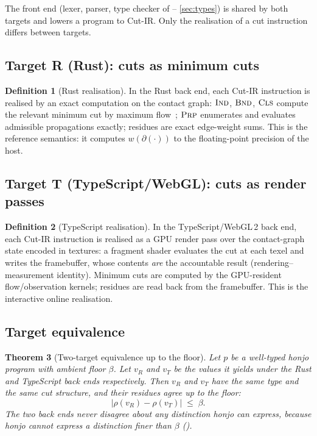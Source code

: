 \documentclass[11pt,a4paper]{article}
\theoremstyle{thmstyle}
\newtheorem{theorem}{Theorem}[section]
\theoremstyle{definition}
\newtheorem{definition}[theorem]{Definition}
\theoremstyle{remark}
\newcommand{\flo}{\beta}
\newcommand{\res}{\rho}
\newcommand{\cut}{\partial}
\newcommand{\abs}[1]{\lvert#1\rvert}
\begin{document}
The front end (lexer, parser, type checker of --%
\ref{sec:types}) is shared by both targets and lowers a program to Cut-IR.
Only the realisation of a cut instruction differs between targets.

\subsection{Target R (Rust): cuts as minimum cuts}

\begin{definition}[Rust realisation]
\label{def:rust-target}
In the Rust back end, each Cut-IR instruction is realised by an exact
computation on the contact graph: $\textsc{Ind}$, $\textsc{Bnd}$,
$\textsc{Cls}$ compute the relevant minimum cut by maximum
flow~\citep{fordfulkerson1956,cormen2009}; $\textsc{Prp}$ enumerates and
evaluates admissible propagations exactly; residues are exact edge-weight
sums. This is the reference semantics: it computes
$w(\cut(\cdot))$ to the floating-point precision of the host.
\end{definition}

\subsection{Target T (TypeScript/WebGL): cuts as render passes}

\begin{definition}[TypeScript realisation]
\label{def:ts-target}
In the TypeScript/WebGL\,2 back end, each Cut-IR instruction is realised
as a GPU render pass over the contact-graph state encoded in textures: a
fragment shader evaluates the cut at each texel and writes the
framebuffer, whose contents \emph{are} the accountable result
(rendering--measurement identity). Minimum cuts are computed by the
GPU-resident flow/observation kernels; residues are read back from the
framebuffer. This is the interactive online realisation.
\end{definition}

\subsection{Target equivalence}

\begin{theorem}[Two-target equivalence up to the floor]
\label{thm:target-equiv}
Let $p$ be a well-typed honjo program with ambient floor $\flo$. Let
$v_R$ and $v_T$ be the values it yields under the Rust and
TypeScript back ends respectively. Then $v_R$ and $v_T$ have the same
type and the same cut structure, and their residues agree up to the
floor:
\[
\abs{\res(v_R)-\res(v_T)}\;\le\;\flo .
\]
The two back ends never disagree about any distinction honjo can express,
because honjo cannot express a distinction finer than $\flo$
().
\end{theorem}
\end{document}
